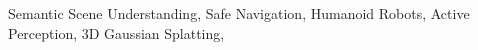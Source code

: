 \documentclass[conference]{IEEEtran}
\begin{document}
\begin{keywords}
Semantic Scene Understanding, Safe Navigation, Humanoid Robots, Active Perception, 3D Gaussian Splatting, 
\end{keywords}

\IEEEpeerreviewmaketitle





\end{document}
